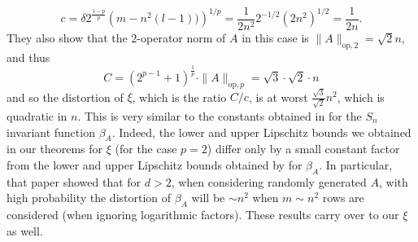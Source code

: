 \documentclass{amsart}
\theoremstyle{plain}
\theoremstyle{definition}
\theoremstyle{remark}
\begin{document}
\begin{equation}
   c =\delta2^{\frac{1-p}{p}} \left(m-n^2(l-1))\right)^{1/p}=\frac{1}{2n^2}2^{-1/2}(2n^2)^{1/2}=\frac{1}{2n}. 
\end{equation}
They also show that the $2$-operator norm of $A$ in this case is 
$\|A\|_{\text{op},2}=\sqrt{2} n$, and thus 
\begin{equation}
   C = \left(2^{p-1} + 1\right)^{\frac{1}{p}}  \cdot \|A\|_{\text{op},p}=\sqrt{3}\cdot \sqrt{2} \cdot n   
\end{equation}
and so the distortion of $\xi$, which is the ratio $C/c $, is at worst $\frac{\sqrt 3}{\sqrt 2}n^2 $, which is quadratic in $n$. This is very similar to the constants obtained in  \cite{dym2025quantitativeboundssortingbasedpermutationinvariant} for the $S_n$ invariant function $\beta_A$. Indeed, the lower and upper Lipschitz bounds we obtained in our theorems for $\xi$ (for the case $p=2$) differ only by a small constant factor from the lower and upper Lipschitz bounds obtained by \cite{dym2025quantitativeboundssortingbasedpermutationinvariant} for $\beta_A$.  In particular, that paper showed that for $d>2$, when considering randomly generated $A$, with high probability the distortion of $\beta_A$ will be $\sim n^2 $ when $m \sim n^2$ rows are considered (when ignoring logarithmic factors). These results carry over to our $\xi$ as well. 
\end{document}
